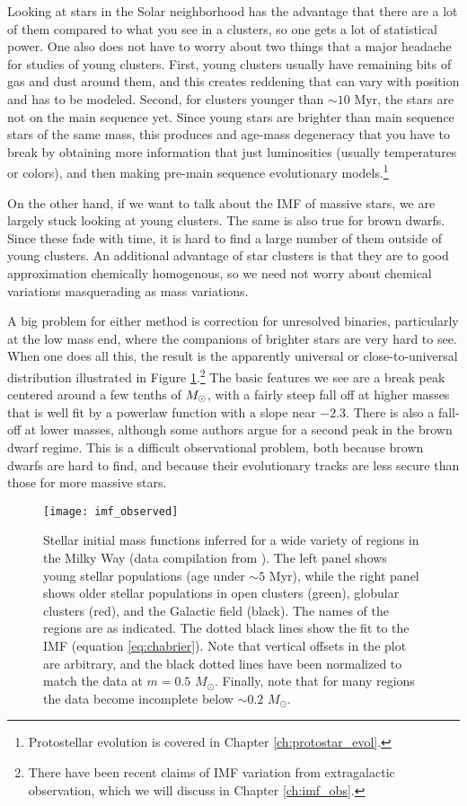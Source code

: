 Looking at stars in the Solar neighborhood has the advantage that there are a lot of them compared to what you see in a clusters, so one gets a lot of statistical power. One also does not have to worry about two things that a major headache for studies of young clusters. First, young clusters usually have remaining bits of gas and dust around them, and this creates reddening that can vary with position and has to be modeled. Second, for clusters younger than $\sim 10$ Myr, the stars are not on the main sequence yet. Since young stars are brighter than main sequence stars of the same mass, this produces and age-mass degeneracy that you have to break by obtaining more information that just luminosities (usually temperatures or colors), and then making pre-main sequence evolutionary models.\footnote{Protostellar evolution is covered in Chapter \ref{ch:protostar_evol}.}

On the other hand, if we want to talk about the IMF of massive stars, we are largely stuck looking at young clusters. The same is also true for brown dwarfs. Since these fade with time, it is hard to find a large number of them outside of young clusters. An additional advantage of star clusters is that they are to good approximation chemically homogenous, so we need not worry about chemical variations masquerading as mass variations.

A big problem for either method is correction for unresolved binaries, particularly at the low mass end, where the companions of brighter stars are very hard to see. When one does all this, the result is the apparently universal or close-to-universal distribution illustrated in Figure \ref{fig:imf_observed}.\footnote{There have been recent claims of IMF variation from extragalactic observation, which we will discuss in Chapter \ref{ch:imf_obs}.} The basic features we see are a break peak centered around a few tenths of $M_{\odot}$, with a fairly steep fall off at higher masses that is well fit by a powerlaw function with a slope near $-2.3$. There is also a fall-off at lower masses, although some authors argue for a second peak in the brown dwarf regime. This is a difficult observational problem, both because brown dwarfs are hard to find, and because their evolutionary tracks are less secure than those for more massive stars.

\begin{figure}
\texttt{[image: imf\_observed]}
\caption[Measured stellar IMFs in a variety of regions]{
\label{fig:imf_observed}
Stellar initial mass functions inferred for a wide variety of regions in the Milky Way (data compilation from \citealt{bastian10a}). The left panel shows young stellar populations (age under $\sim 5$ Myr), while the right panel shows older stellar populations in open clusters (green), globular clusters (red), and the Galactic field (black). The names of the regions are as indicated. The dotted black lines show the \citet{chabrier05a} fit to the IMF (equation \ref{eq:chabrier}). Note that vertical offsets in the plot are arbitrary, and the black dotted lines have been normalized to match the data at $m=0.5$ $M_\odot$. Finally, note that for many regions the data become incomplete below $\sim 0.2$ $M_\odot$.
}
\end{figure}

